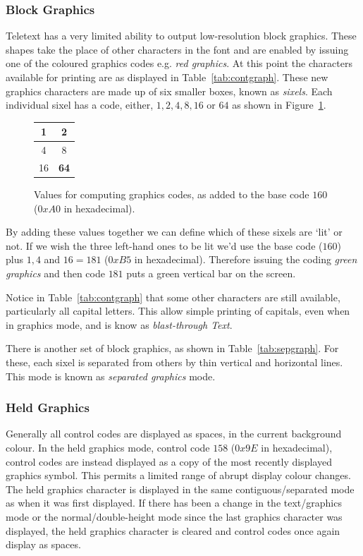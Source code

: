 \subsubsection*{Block Graphics}

Teletext has a very limited ability to output low-resolution block graphics. These
shapes take the place of other characters in the font and are enabled by issuing one
of the coloured graphics codes e.g. {\it red graphics}. At this point the characters
available for printing are as displayed in Table~\ref{tab:contgraph}. These new graphics
characters are made up of six smaller boxes, known as {\it sixels}. Each individual sixel has
a code, either, $1,2,4,8,16$ or $64$ as shown in Figure~\ref{fig:graphcodes}.
\begin{figure}[ht]
\begin{center}
\begin{tabular}{|c|c|}\hline
1 & 2 \\ \hline
4 & 8 \\ \hline
16 & {\bf 64} \\ \hline
\end{tabular}
\end{center}
\caption{Values for computing graphics codes, as added to the base code $160$ ($0xA0$ in hexadecimal).}
\label{fig:graphcodes}
\end{figure}
By adding these values together we can define which
of these sixels are `lit' or not. If we wish the three left-hand
ones to be lit we'd use the base code ($160$) plus $1, 4$ and $16 = 181$ ($0xB5$ in
hexadecimal).
Therefore issuing the coding {\it green graphics} and then code $181$ puts
a green vertical bar on the screen.

Notice in Table~\ref{tab:contgraph} that some other characters are still available,
particularly all capital letters. This allow simple printing of capitals, even
when in graphics mode, and is know as {\it blast-through Text}.

There is another set of block graphics, as shown in Table~\ref{tab:sepgraph}. For these,
each sixel is separated from others by thin vertical and horizontal lines. This mode is known
as {\it separated graphics} mode.

\subsubsection*{Held Graphics}

Generally all control codes are displayed as spaces, in the current
background colour. In the held graphics mode, control code $158$ ($0x9E$
in hexadecimal), control codes are instead displayed as a copy of the most
recently displayed graphics symbol. This permits a limited range of abrupt
display colour changes.  The held graphics character is displayed in the
same contiguous/separated mode as when it was first displayed. If there
has been a change in the text/graphics mode or the normal/double-height
mode since the last graphics character was displayed, the held graphics
character is cleared and control codes once again display as spaces.

